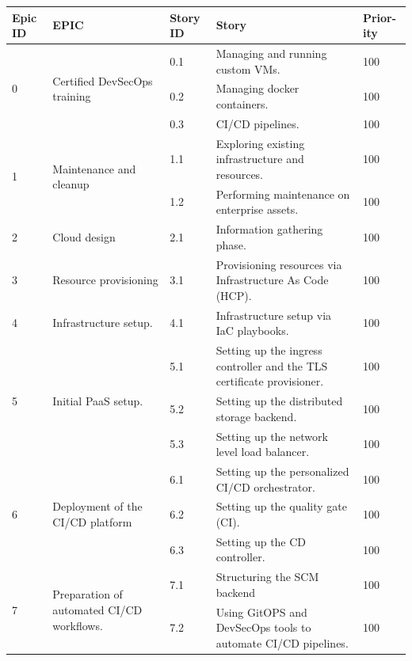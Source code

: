 \begin{longtable}[H]{|m{1cm}|m{3.25cm}|m{1cm}|m{7cm}|m{1.2cm}|}
\hline
 {\textbf{Epic ID}} & {\textbf{EPIC}} & {\textbf{Story ID}} & {\textbf{Story}} & {\textbf{Prior-ity}} \\
\endhead
\hline
\multirow{3}{1cm}{0} & \multirow{3}{3.25cm}{\raggedright Certified DevSecOps training} &	0.1 &	Managing and running custom VMs. & 100\\
\cline{3-5}
&   & 0.2 &	Managing docker containers.	& 100\\
\cline{3-5}
&   & 0.3 &	CI/CD pipelines. & 100\\
\hline
\multirow{2}{1cm}{1} & \multirow{2}{3.25cm}{Maintenance and cleanup} &	1.1	& Exploring existing infrastructure and resources. & 100\\
\cline{3-5}
&   &	1.2 & Performing maintenance on enterprise assets. & 100\\

\hline
2 & Cloud design &	2.1 &	Information gathering phase. & 100\\
\hline
3 & Resource provisioning &	3.1 &	Provisioning resources via Infrastructure As Code (HCP). & 100\\
\hline
4 & Infrastructure setup. &	4.1 &	Infrastructure setup via IaC playbooks. & 100\\
\hline
\multirow{3}{1cm}{5} & \multirow{3}{3.25cm}{\raggedright Initial PaaS setup.} &	5.1 &	Setting up the ingress controller and the TLS certificate provisioner.	 & 100\\
\cline{3-5}
&   & 5.2 &	Setting up the distributed storage backend.	 & 100\\
\cline{3-5}
&   & 5.3 &	Setting up the network level load balancer.	 & 100\\
  \hline
\multirow{3}{1cm}{6} & \multirow{3}{3.25cm}{Deployment of the CI/CD platform} &	6.1 &	Setting up the personalized CI/CD orchestrator.	 & 100\\
\cline{3-5}
&   & 6.2 &	Setting up the quality gate (CI).	 & 100\\
\cline{3-5}
&   & 6.3 & Setting up the CD controller.	 & 100\\
  \hline
\multirow{2}{1cm}{7} & \multirow{2}{3.25cm}{\raggedright Preparation of automated CI/CD workflows.} &	7.1 &	Structuring the SCM backend	 & 100\\

\cline{3-5}
&   & 7.2 &	 \raggedright Using GitOPS and DevSecOps tools to automate CI/CD pipelines.	 & 100\\
\hline



\end{longtable}

